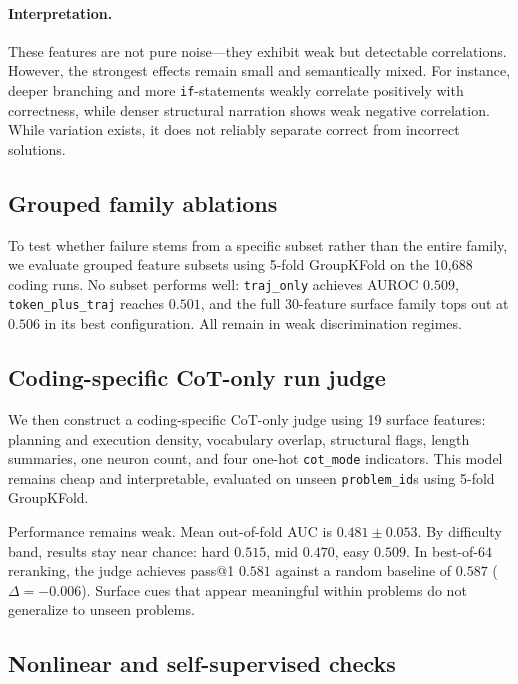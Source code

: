 \documentclass[10pt,twocolumn]{article}
\begin{document}
\paragraph{Interpretation.}
These features are not pure noise---they exhibit weak but detectable correlations. However, the strongest effects remain small and semantically mixed. For instance, deeper branching and more \texttt{if}-statements weakly correlate positively with correctness, while denser structural narration shows weak negative correlation. While variation exists, it does not reliably separate correct from incorrect solutions.

\subsection{Grouped family ablations}

To test whether failure stems from a specific subset rather than the entire family, we evaluate grouped feature subsets using 5-fold GroupKFold on the 10,688 coding runs. No subset performs well: \texttt{traj\_only} achieves AUROC $0.509$, \texttt{token\_plus\_traj} reaches $0.501$, and the full 30-feature surface family tops out at $0.506$ in its best configuration. All remain in weak discrimination regimes.

\subsection{Coding-specific CoT-only run judge}

We then construct a coding-specific CoT-only judge using 19 surface features: planning and execution density, vocabulary overlap, structural flags, length summaries, one neuron count, and four one-hot \texttt{cot\_mode} indicators. This model remains cheap and interpretable, evaluated on unseen \texttt{problem\_id}s using 5-fold GroupKFold.

Performance remains weak. Mean out-of-fold AUC is $0.481 \pm 0.053$. By difficulty band, results stay near chance: hard $0.515$, mid $0.470$, easy $0.509$. In best-of-$64$ reranking, the judge achieves pass@1 $0.581$ against a random baseline of $0.587$ ($\Delta=-0.006$). Surface cues that appear meaningful within problems do not generalize to unseen problems.

\subsection{Nonlinear and self-supervised checks}
\end{document}
